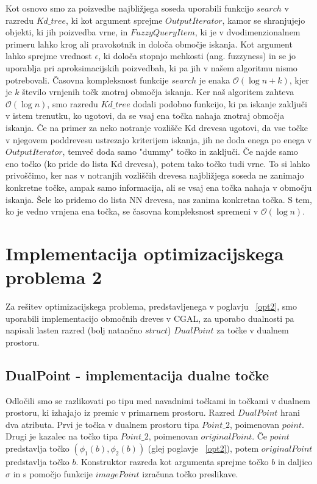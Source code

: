 \documentclass[a4paper, 12pt]{book}
\newcommand{\OO}{\ensuremath{\mathcal{O}}} %
\begin{document}
Kot osnovo smo za poizvedbe najbližjega soseda uporabili funkcijo $search$ v razredu $Kd{\_}tree$, ki kot argument sprejme $OutputIterator$, kamor se shranjujejo objekti, ki jih poizvedba vrne, in $FuzzyQueryItem$, ki je v dvodimenzionalnem primeru lahko krog ali pravokotnik in določa območje iskanja. Kot argument lahko sprejme vrednost $\epsilon$, ki določa stopnjo mehkosti (ang. fuzzyness) in se jo uporablja pri aproksimacijskih poizvedbah, ki pa jih v našem algoritmu nismo potrebovali. Časovna kompleksnost funkcije $search$ je enaka $\OO(\log n + k)$, kjer je $k$ število vrnjenih točk znotraj območja iskanja. Ker naš algoritem zahteva $\OO(\log n)$, smo razredu $Kd{\_}tree$ dodali podobno funkcijo, ki pa iskanje zaključi v istem trenutku, ko ugotovi, da se vsaj ena točka nahaja znotraj območja iskanja. Če na primer za neko notranje vozlišče Kd drevesa ugotovi, da vse točke v njegovem poddrevesu ustrezajo kriterijem iskanja, jih ne doda enega po enega v $OutputIterator$, temveč doda samo "dummy" točko in zaključi. Če najde samo eno točko (ko pride do lista Kd drevesa), potem tako točko tudi vrne. To si lahko privoščimo, ker nas v notranjih vozliščih drevesa najbližjega soseda ne zanimajo konkretne točke, ampak samo informacija, ali se vsaj ena točka nahaja v območju iskanja. Šele ko pridemo do lista NN drevesa, nas zanima konkretna točka. S tem, ko je vedno vrnjena ena točka, se časovna kompleksnost spremeni v $\OO(\log n)$.

\section{Implementacija optimizacijskega problema 2}

Za rešitev optimizacijskega problema, predstavljenega v poglavju ~\ref{opt2}, smo uporabili implementacijo območnih dreves v CGAL, za uporabo dualnosti pa napisali lasten razred (bolj natančno $struct$) $DualPoint$ za točke v dualnem prostoru.

\subsection{DualPoint - implementacija dualne točke}

Odločili smo se razlikovati po tipu med navadnimi točkami in točkami v dualnem prostoru, ki izhajajo iz premic v primarnem prostoru. Razred $DualPoint$ hrani dva atributa. Prvi je točka v dualnem prostoru tipa $Point\texttt{\_}2$, poimenovan $point$. Drugi je kazalec na točko tipa $Point\texttt{\_}2$, poimenovan $originalPoint$. Če $point$ predstavlja točko $(\phi_1(b), \phi_2(b))$ (glej poglavje ~\ref{opt2}), potem $originalPoint$ predstavlja točko $b$. Konstruktor razreda kot argumenta sprejme točko $b$ in daljico $\sigma$ in s pomočjo funkcije $imagePoint$ izračuna točko preslikave.
\end{document}
